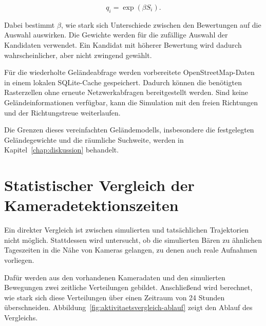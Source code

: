 \documentclass[12pt,a4paper]{report}
\begin{document}
\begin{equation}
    q_i = \exp(\beta S_i).
    \label{eq:japan-richtungsgewicht}
\end{equation}

Dabei bestimmt $\beta$, wie stark sich Unterschiede
zwischen den Bewertungen auf die Auswahl auswirken.
Die Gewichte werden für die zufällige Auswahl
der Kandidaten verwendet. Ein Kandidat mit höherer
Bewertung wird dadurch wahrscheinlicher, aber
nicht zwingend gewählt.

Für die wiederholte Geländeabfrage werden vorbereitete
OpenStreetMap-Daten in einem lokalen SQLite-Cache
gespeichert. Dadurch können die benötigten Rasterzellen
ohne erneute Netzwerkabfragen bereitgestellt werden.
Sind keine Geländeinformationen verfügbar, kann die
Simulation mit den freien Richtungen und der
Richtungstreue weiterlaufen.

Die Grenzen dieses vereinfachten Geländemodells,
insbesondere die festgelegten Geländegewichte und
die räumliche Suchweite, werden in
Kapitel~\ref{chap:diskussion} behandelt.



\section{Statistischer Vergleich der Kameradetektionszeiten}
\label{sec:tagesrhythmus}

Ein direkter Vergleich ist zwischen
simulierten und tatsächlichen Trajektorien nicht möglich.
Stattdessen wird untersucht, ob die simulierten Bären zu
ähnlichen Tageszeiten in die Nähe von Kameras gelangen,
zu denen auch reale Aufnahmen vorliegen.

Dafür werden aus den vorhandenen Kameradaten und den
simulierten Bewegungen zwei zeitliche Verteilungen gebildet.
Anschließend wird berechnet, wie stark sich diese
Verteilungen über einen Zeitraum von 24 Stunden überschneiden.
Abbildung~\ref{fig:aktivitaetsvergleich-ablauf} zeigt
den Ablauf des Vergleichs.
\end{document}
